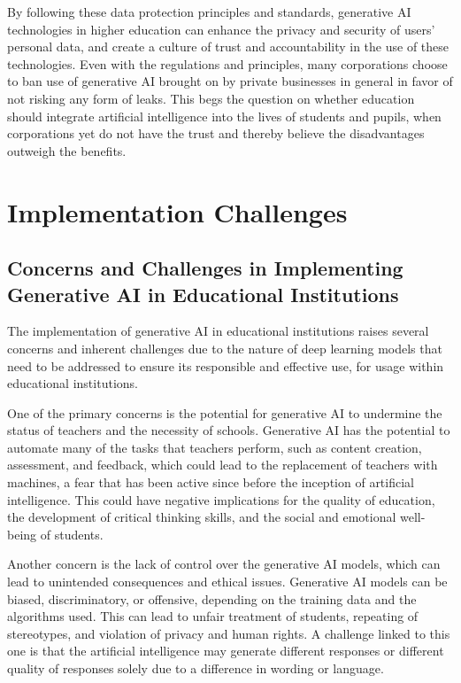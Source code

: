 \documentclass[a4paper,12pt]{report}
\begin{document}
By following these data protection principles and standards, generative AI technologies in higher education can enhance the privacy and security of users’ personal data, and create a culture of trust and accountability in the use of these technologies. Even with the regulations and principles, many corporations choose to ban use of generative AI brought on by private businesses in general in favor of not risking any form of leaks. This begs the question on whether education should integrate artificial intelligence into the lives of students and pupils, when corporations yet do not have the trust and thereby believe the disadvantages outweigh the benefits.

\newpage
\chapter{Implementation Challenges} \label{chap:implementation}
\newpage
\section{Concerns and Challenges in Implementing Generative AI in Educational Institutions} \label{sect:implementation-challenges}

\hspace{10mm} The implementation of generative AI in educational institutions raises several concerns and inherent challenges due to the nature of deep learning models that need to be addressed to ensure its responsible and effective use, for usage within educational institutions.

One of the primary concerns is the potential for generative AI to undermine the status of teachers and the necessity of schools. Generative AI has the potential to automate many of the tasks that teachers perform, such as content creation, assessment, and feedback, which could lead to the replacement of teachers with machines, a fear that has been active since before the inception of artificial intelligence. This could have negative implications for the quality of education, the development of critical thinking skills, and the social and emotional well-being of students.

Another concern is the lack of control over the generative AI models, which can lead to unintended consequences and ethical issues. Generative AI models can be biased, discriminatory, or offensive, depending on the training data and the algorithms used. This can lead to unfair treatment of students, repeating of stereotypes, and violation of privacy and human rights. A challenge linked to this one is that the artificial intelligence may generate different responses or different quality of responses solely due to a difference in wording or language.
\end{document}
